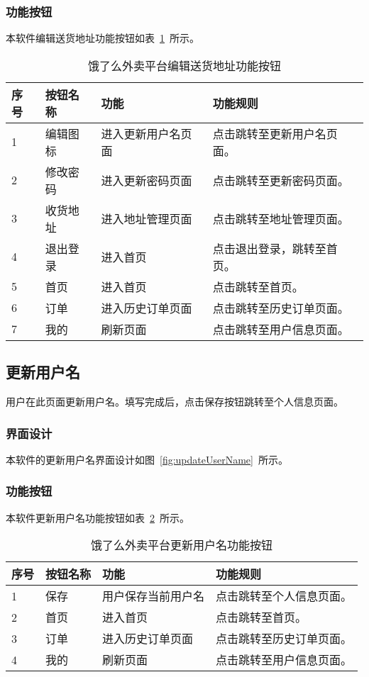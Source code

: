 \subsubsection{功能按钮}
本软件编辑送货地址功能按钮如表~\ref{tab:table13}~所示。
\begin{table}[htbp]
    \caption{饿了么外卖平台编辑送货地址功能按钮}\label{tab:table13}
    \vspace{0.5em}\wuhao
    \begin{tabularx}{\textwidth}{lllX}
    \toprule[1.5pt]
    序号 & 按钮名称 & 功能 & 功能规则 \\ 
    \midrule[1pt]
    1 & 编辑图标 & 进入更新用户名页面 & 点击跳转至更新用户名页面。 \\
    2 & 修改密码 & 进入更新密码页面 & 点击跳转至更新密码页面。 \\
    3 & 收货地址 & 进入地址管理页面 & 点击跳转至地址管理页面。 \\
    4 & 退出登录 & 进入首页 & 点击退出登录，跳转至首页。 \\
    5 & 首页 & 进入首页 & 点击跳转至首页。 \\
    6 & 订单 & 进入历史订单页面 & 点击跳转至历史订单页面。 \\
    7 & 我的 & 刷新页面 & 点击跳转至用户信息页面。 \\
\bottomrule[1.5pt]
\end{tabularx}
\vspace{\baselineskip}
\end{table}

\subsection{更新用户名}
用户在此页面更新用户名。填写完成后，点击保存按钮跳转至个人信息页面。
\subsubsection{界面设计}
本软件的更新用户名界面设计如图~\ref{fig:updateUserName}~所示。
\subsubsection{功能按钮}
本软件更新用户名功能按钮如表~\ref{tab:table14}~所示。
\begin{table}[htbp]
    \caption{饿了么外卖平台更新用户名功能按钮}\label{tab:table14}
    \vspace{0.5em}\wuhao
    \begin{tabularx}{\textwidth}{lllX}
    \toprule[1.5pt]
    序号 & 按钮名称 & 功能 & 功能规则 \\ 
    \midrule[1pt]
    1 & 保存 & 用户保存当前用户名 & 点击跳转至个人信息页面。 \\
    2 & 首页 & 进入首页 & 点击跳转至首页。 \\
    3 & 订单 & 进入历史订单页面 & 点击跳转至历史订单页面。 \\
    4 & 我的 & 刷新页面 & 点击跳转至用户信息页面。 \\
\bottomrule[1.5pt]
\end{tabularx}
\vspace{\baselineskip}
\end{table}


